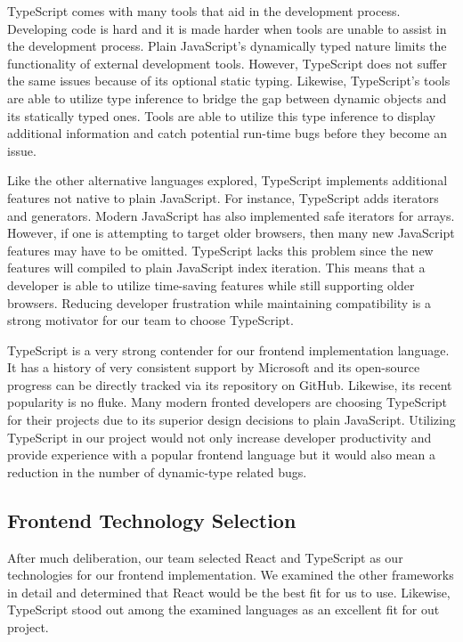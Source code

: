 \documentclass[12pt]{report}
\begin{document}
TypeScript comes with many tools that aid in the development process. Developing code is hard and it is made harder when tools are unable to assist in the development process. Plain JavaScript's dynamically typed nature limits the functionality of external development tools. However, TypeScript does not suffer the same issues because of its optional static typing. Likewise, TypeScript's tools are able to utilize type inference to bridge the gap between dynamic objects and its statically typed ones.\cite{typescripthomepage} Tools are able to utilize this type inference to display additional information and catch potential run-time bugs before they become an issue.

Like the other alternative languages explored, TypeScript implements additional features not native to plain JavaScript. For instance, TypeScript adds iterators and generators. Modern JavaScript has also implemented safe iterators for arrays. However, if one is attempting to target older browsers, then many new JavaScript features may have to be omitted. TypeScript lacks this problem since the new features will compiled to plain JavaScript index iteration. This means that a developer is able to utilize time-saving features while still supporting older browsers. Reducing developer frustration while maintaining compatibility is a strong motivator for our team to choose TypeScript.

TypeScript is a very strong contender for our frontend implementation language. It has a history of very consistent support by Microsoft and its open-source progress can be directly tracked via its repository on GitHub. Likewise, its recent popularity is no fluke. Many modern fronted developers are choosing TypeScript for their projects due to its superior design decisions to plain JavaScript. Utilizing TypeScript in our project would not only increase developer productivity and provide experience with a popular frontend language but it would also mean a reduction in the number of dynamic-type related bugs.

\subsection*{Frontend Technology Selection}

After much deliberation, our team selected React and TypeScript as our technologies for our frontend implementation. We examined the other frameworks in detail and determined that React would be the best fit for us to use. Likewise, TypeScript stood out among the examined languages as an excellent fit for out project.
\end{document}
